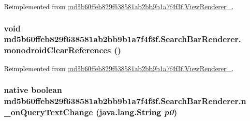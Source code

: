 Reimplemented from \hyperlink{classmd5b60ffeb829f638581ab2bb9b1a7f4f3f_1_1_view_renderer__2_64ca8244a89f60a47c173d9c0b15d610}{md5b60ffeb829f638581ab2bb9b1a7f4f3f.ViewRenderer\_}.\hypertarget{classmd5b60ffeb829f638581ab2bb9b1a7f4f3f_1_1_search_bar_renderer_3c10c17f8a9cdc8b84310d45c845399a}{
\subsubsection[{monodroidClearReferences}]{\setlength{\rightskip}{0pt plus 5cm}void md5b60ffeb829f638581ab2bb9b1a7f4f3f.SearchBarRenderer.monodroidClearReferences ()}}
\label{classmd5b60ffeb829f638581ab2bb9b1a7f4f3f_1_1_search_bar_renderer_3c10c17f8a9cdc8b84310d45c845399a}




Reimplemented from \hyperlink{classmd5b60ffeb829f638581ab2bb9b1a7f4f3f_1_1_view_renderer__2_dae20979ac761a65aa60c9b427509c37}{md5b60ffeb829f638581ab2bb9b1a7f4f3f.ViewRenderer\_}.\hypertarget{classmd5b60ffeb829f638581ab2bb9b1a7f4f3f_1_1_search_bar_renderer_35b5d784e982cf14b6da8df89ad0d0ee}{
\subsubsection[{n\_\-onQueryTextChange}]{\setlength{\rightskip}{0pt plus 5cm}native boolean md5b60ffeb829f638581ab2bb9b1a7f4f3f.SearchBarRenderer.n\_\-onQueryTextChange (java.lang.String {\em p0})}}
\label{classmd5b60ffeb829f638581ab2bb9b1a7f4f3f_1_1_search_bar_renderer_35b5d784e982cf14b6da8df89ad0d0ee}


